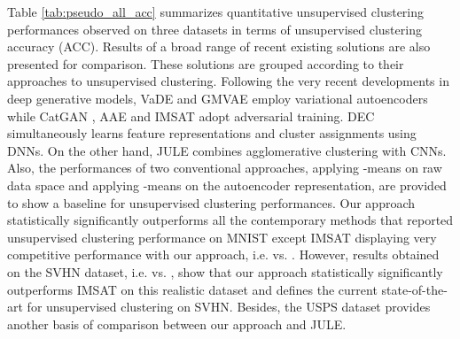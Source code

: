 \documentclass{article} \usepackage{iclr2018_conference,times}
\begin{document}
Table \ref{tab:pseudo_all_acc} summarizes quantitative unsupervised clustering performances observed on three datasets in terms of unsupervised clustering accuracy (ACC). Results of a broad range of recent existing solutions are also presented for comparison. These solutions are grouped according to their approaches to unsupervised clustering. Following the very recent developments in deep generative models, VaDE \citep{JiangZTTZ17} and GMVAE \citep{DilokthanakulMG16} employ variational autoencoders while CatGAN \citep{Springenberg15}, AAE \citep{MakhzaniSJG15} and IMSAT \citep{HuMTMS17} adopt adversarial training. DEC \citep{XieGF16} simultaneously learns feature representations and cluster assignments using DNNs. On the other hand, JULE \citep{YangPB16} combines agglomerative clustering with CNNs. Also, the performances of two conventional approaches, applying -means on raw data space and applying -means on the autoencoder representation, are provided to show a baseline for unsupervised clustering performances. Our approach statistically significantly outperforms all the contemporary methods that reported unsupervised clustering performance on MNIST except IMSAT \citep{HuMTMS17} displaying very competitive performance with our approach, i.e.  vs. . However, results obtained on the SVHN dataset, i.e.  vs. , show that our approach statistically significantly outperforms IMSAT on this realistic dataset and defines the current state-of-the-art for unsupervised clustering on SVHN. Besides, the USPS dataset provides another basis of comparison between our approach and JULE. 
\end{document}
